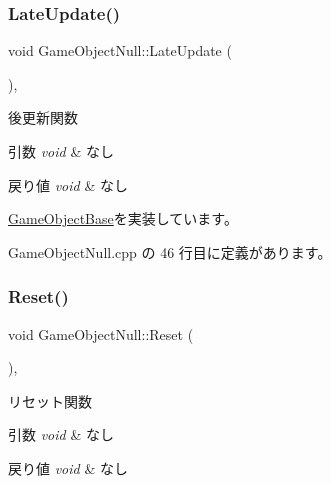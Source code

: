 \subsubsection{\texorpdfstring{Late\+Update()}{LateUpdate()}}
{\footnotesize\ttfamily void Game\+Object\+Null\+::\+Late\+Update (\begin{DoxyParamCaption}{ }\end{DoxyParamCaption})\hspace{0.3cm}{\ttfamily [override]}, {\ttfamily [virtual]}}



後更新関数 


\begin{DoxyParams}{引数}
{\em void} & なし \\
\hline
\end{DoxyParams}

\begin{DoxyRetVals}{戻り値}
{\em void} & なし \\
\hline
\end{DoxyRetVals}


\mbox{\hyperlink{class_game_object_base_a4536510d363ce3ee4c911feaa8519821}{Game\+Object\+Base}}を実装しています。



 Game\+Object\+Null.\+cpp の 46 行目に定義があります。

\mbox{\label{class_game_object_null_a26a748e17ea31b987249022562f5198c}} 
\subsubsection{\texorpdfstring{Reset()}{Reset()}}
{\footnotesize\ttfamily void Game\+Object\+Null\+::\+Reset (\begin{DoxyParamCaption}{ }\end{DoxyParamCaption})\hspace{0.3cm}{\ttfamily [override]}, {\ttfamily [virtual]}}



リセット関数 


\begin{DoxyParams}{引数}
{\em void} & なし \\
\hline
\end{DoxyParams}

\begin{DoxyRetVals}{戻り値}
{\em void} & なし \\
\hline
\end{DoxyRetVals}


